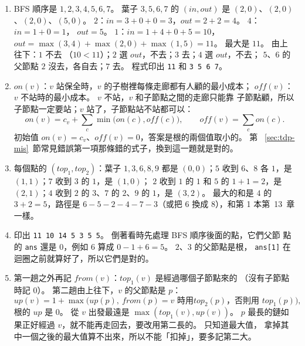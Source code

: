 \begin{enumerate}
\item BFS 順序是 $1, 2, 3, 4, 5, 6, 7$。 葉子 $3, 5, 6, 7$ 的 $(\mathit{in},
\mathit{out})$ 是 $(2, 0)$、$(2, 0)$、$(2, 0)$、$(5, 0)$。 $2$：$\mathit{in} = 3
+ 0 + 0 = 3$，$\mathit{out} = 2 + 2 = 4$。 $4$：$\mathit{in} = 1 + 0 = 1$，
$\mathit{out} = 5$。 $1$：$\mathit{in} = 1 + 4 + 0 + 5 = 10$，$\mathit{out} =
\max(3, 4) + \max(2, 0) + \max(1, 5) = 11$。 最大是 $11$。 由上往下：$1$ 不去
（$10 < 11$）；$2$ 選 $\mathit{out}$，不去；$3$ 去；$4$ 選 $\mathit{out}$，不去；
$5$、$6$ 的父節點 $2$ 沒去，各自去；$7$ 去。 程式印出 \texttt{11} 和
\texttt{3 5 6 7}。

\item $\mathit{on}(v)$：$v$ 站保全時，$v$ 的子樹裡每條走廊都有人顧的最小成本；
$\mathit{off}(v)$：$v$ 不站時的最小成本。 $v$ 不站，$v$ 和子節點之間的走廊只能靠
子節點顧，所以子節點一定要站；$v$ 站了，子節點站不站都可以：
\[
\mathit{on}(v) = c_v + \sum_c \min\bigl(\mathit{on}(c), \mathit{off}(c)\bigr),\qquad
\mathit{off}(v) = \sum_c \mathit{on}(c).
\]
初始值 $\mathit{on}(v) = c_v$、$\mathit{off}(v) = 0$，答案是根的兩個值取小的。 第
~\ref{sec:tdp-mis}~節常見錯誤第一項那條錯的式子，換到這一題就是對的。

\item 每個點的 $(\mathit{top}_1, \mathit{top}_2)$：葉子 $1, 3, 6, 8, 9$ 都是
$(0, 0)$；$5$ 收到 $6$、$8$ 各 $1$，是 $(1, 1)$；$7$ 收到 $3$ 的 $1$，是 $(1, 0)$；
$2$ 收到 $1$ 的 $1$ 和 $5$ 的 $1 + 1 = 2$，是 $(2, 1)$；$4$ 收到 $2$ 的 $3$、$7$
的 $2$、$9$ 的 $1$，是 $(3, 2)$。 最大的和是 $4$ 的 $3 + 2 = 5$，路徑是 $6 - 5 - 2
- 4 - 7 - 3$（或把 $6$ 換成 $8$），和第 1 本第~13~章一樣。

\item 印出 \texttt{11 10 14 5 3 5 5}。 倒著看時先處理 BFS 順序後面的點，它們父節
點的 \texttt{ans} 還是 $0$，例如 $6$ 算成 $0 - 1 + 6 = 5$。 $2$、$3$ 的父節點是根，
\texttt{ans[1]} 在迴圈之前就算好了，所以它們是對的。

\item 第一趟之外再記 $\mathit{from}(v)$：$\mathit{top}_1(v)$ 是經過哪個子節點來的
（沒有子節點時記 $0$）。 第二趟由上往下，$v$ 的父節點是 $p$：
\[
\mathit{up}(v) = 1 + \max\bigl(\mathit{up}(p),\ \text{$\mathit{from}(p) = v$ 時用
$\mathit{top}_2(p)$，否則用 $\mathit{top}_1(p)$}\bigr),
\]
根的 $\mathit{up}$ 是 $0$。 從 $v$ 出發最遠是 $\max(\mathit{top}_1(v),
\mathit{up}(v))$。 $p$ 最長的鏈如果正好經過 $v$，就不能再走回去，要改用第二長的。 只知道最大值，
拿掉其中一個之後的最大值算不出來，所以不能「扣掉」，要多記第二大。


\end{enumerate}
